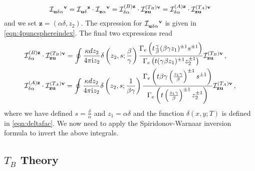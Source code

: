 \documentclass[main.tex]{subfiles}
\begin{document}
\begin{equation}\label{eqn:indequivtrin}
\mathcal{I} \indices{_{\mathbf{u}}_{\delta}_{\alpha}^{\mathbf{v}}}=\mathcal{I} \indices{_{\mathbf{u}}_{\delta}^{\mathbf{z}}}\cdot \mathcal{I} \indices{_{\mathbf{z}}_{\alpha}^{\mathbf{v}}}=\mathcal{I} ^{(B)\mathbf{z}}_{\delta\alpha}\cdot \mathcal{I}  ^{(T_B)\mathbf{v}}_{\mathbf{z}\mathbf{u}}= \mathcal{I}  ^{(A)\mathbf{z}}_{\delta\alpha}\cdot \mathcal{I}  ^{(T_A)\mathbf{v}}_{\mathbf{z}\mathbf{u}}
\end{equation}
and we set $\mathbf{z}=(\alpha\delta,z_2)$. The expression for $ \mathcal{I}  \indices{_{\mathbf{u}}_{\delta}_{\alpha}^{\mathbf{v}}}$ is given in \eqref{eqn:4puncsphereindex}.
The final two  expressions read \cite{Gaiotto:2015usa,Razamat:2016dpl}
\begin{equation}\label{eqn:4puncstrong}
\begin{aligned}
& \mathcal{I}  ^{(B)\mathbf{z}}_{\delta\alpha}\cdot \mathcal{I}  ^{(T_B)\mathbf{v}}_{\mathbf{z}\mathbf{u}}=\oint\frac{\kappa dz_2}{4\pi\mathrm{i} z_2}\delta\left(z_2,s;\frac{\beta}{\gamma}\right)\frac{\Gamma_e\left(t\frac{\gamma}{\beta}(\beta\gamma z_1)^{\pm1}s^{\pm1}\right)}{\Gamma_e\left(t(\gamma\beta z_1)^{\pm1}z_2^{\pm1}\right)} \mathcal{I}  ^{(T_B)\mathbf{v}}_{\mathbf{z}\mathbf{u}}\,,\\
& \mathcal{I}  ^{(A)\mathbf{z}}_{\delta\alpha}\cdot \mathcal{I}  ^{(T_A)\mathbf{v}}_{\mathbf{z}\mathbf{u}}=\oint\frac{\kappa dz_2}{4\pi\mathrm{i} z_2}\delta\left(z_2,s;\frac{1}{\beta\gamma}\right)\frac{\Gamma_e\left(t\beta\gamma\left(\frac{z_1\gamma}{\beta}\right)^{\pm1}s^{\pm1}\right)}{\Gamma_e\left(t\left(\frac{z_1\gamma}{\beta}\right)^{\pm1}z_2^{\pm1}\right)} \mathcal{I}  ^{(T_A)\mathbf{v}}_{\mathbf{z}\mathbf{u}}\,,
\end{aligned}
\end{equation}
where we have defined $s=\frac{\delta}{\alpha}$ and $z_1=\alpha\delta$ and the function $\delta(x,y;T)$ is defined in \eqref{eqn:deltafac}. We now need to apply the Spiridonov-Warnaar inversion formula \cite{2004math11044S} to invert the above integrals.

\subsection{\texorpdfstring{$T_B$}{TB} Theory}
\end{document}
